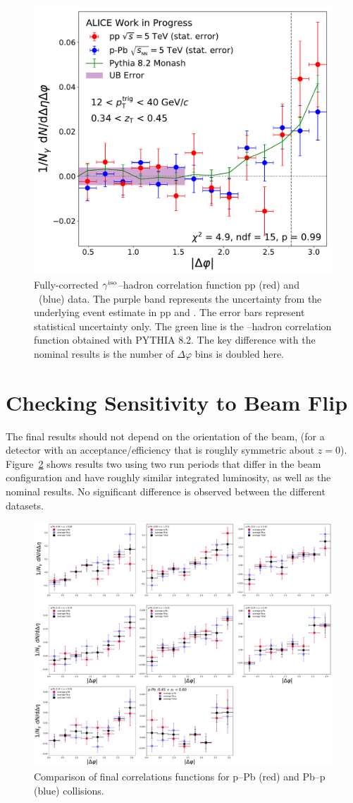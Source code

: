 \begin{figure}
\includegraphics[width = 0.24 \textwidth]{G-H_New/16_dPhi/Cs_Final_Indv_pT_0_zT_6.pdf}
\caption{Fully-corrected $\gamma^\mathrm{iso}$--hadron correlation function pp (red) and \pPb~(blue) data. The purple band represents the uncertainty from the underlying event estimate in pp and \pPb. The error bars represent statistical uncertainty only. The green line is the \gammaiso--hadron correlation function obtained with \textsc{PYTHIA 8.2}. The key difference with the nominal results is the number of $\Delta\varphi$ bins is doubled here.}
\label{fig:dph_bin_variation}
\end{figure}


\section{Checking Sensitivity to Beam Flip}
The final results should not depend on the orientation of the beam, (for a detector with an acceptance/efficiency that is roughly symmetric about $z=0$). Figure~\ref{fig:Cs_Beam_Flip} shows results two using two run periods that differ in the beam configuration and have roughly similar integrated luminosity, as well as the nominal results. No significant difference is observed between the different datasets. 

\begin{figure}[hbtp]
\centering
\includegraphics[width = 0.9 \textwidth]{G-H_New/Cs_Averages_p-Pb_Beam_Flip.pdf}
\caption{Comparison of final correlations functions for p--Pb (red) and Pb--p (blue) collisions.}
\label{fig:Cs_Beam_Flip}
\end{figure}



